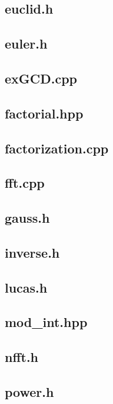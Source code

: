 \subsection{euclid.h}

\subsection{euler.h}

\subsection{exGCD.cpp}

\subsection{factorial.hpp}

\subsection{factorization.cpp}

\subsection{fft.cpp}

\subsection{gauss.h}

\subsection{inverse.h}

\subsection{lucas.h}

\subsection{mod\_int.hpp}

\subsection{nfft.h}

\subsection{power.h}

